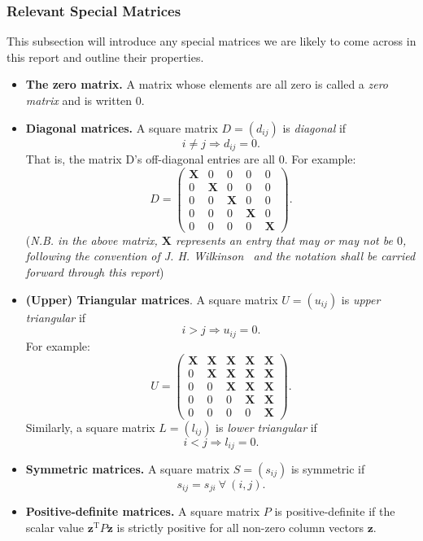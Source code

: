 \documentclass[10pt,a4paper]{article}
\numberwithin{equation}{section}
\theoremstyle{plain}
\newcommand{\mbfx}{\mathbf{X}}
\theoremstyle{own}
\begin{document}
\subsubsection{Relevant Special Matrices}
This subsection will introduce any special matrices we are likely to come across in this report and outline their properties.
\begin{itemize}
\item \textbf{The zero matrix.} A matrix whose elements are all zero is called a \textit{zero matrix} and is written $0$.
\item \textbf{Diagonal matrices.} A square matrix $D = (d_{ij})$ is \textit{diagonal} if \[i \neq j\Rightarrow d_{ij} = 0. \]
That is, the matrix D's off-diagonal entries are all 0. For example:
\[ D = \left( \begin{matrix}
						\mbfx & 0 & 0 & 0 & 0\\
						0 & \mbfx & 0 & 0 & 0\\
						0 & 0 & \mbfx & 0 & 0\\
						0 & 0 & 0 & \mbfx & 0\\
						0 & 0 & 0 & 0 & \mbfx \end{matrix} \right). \]
(\textit{N.B. in the above matrix, $\mbfx$ represents an entry that may or may not be $0$, following the convention of J. H. Wilkinson~\cite{Wilkinson} and the notation shall be carried forward through this report})
\item \textbf{(Upper) Triangular matrices}. A square matrix $U = (u_{ij})$ is \textit{upper triangular} if
\[ i > j \Rightarrow u_{ij} = 0. \]	
For example:
\[ U = \left( \begin{matrix}
						\mbfx & \mbfx & \mbfx & \mbfx & \mbfx\\
						0 & \mbfx & \mbfx & \mbfx & \mbfx\\
						0 & 0 & \mbfx & \mbfx & \mbfx\\
						0 & 0 & 0 & \mbfx & \mbfx\\
						0 & 0 & 0 & 0 & \mbfx \end{matrix} \right). \]	
Similarly, a square matrix $L = (l_{ij})$ is \textit{lower triangular} if
\[ i < j \Rightarrow l_{ij} = 0. \]
\item \textbf{Symmetric matrices.} A square matrix $S = (s_{ij})$ is symmetric if \[ s_{ij} = s_{ji}~\forall~(i,j).\]
\item \textbf{Positive-definite matrices.} A square matrix $P$ is positive-definite if the scalar value $\mathbf{z}^{\text{T}} P \mathbf{z}$ is strictly positive for all non-zero column vectors $\textbf{z}$.
\end{itemize}
\end{document}

